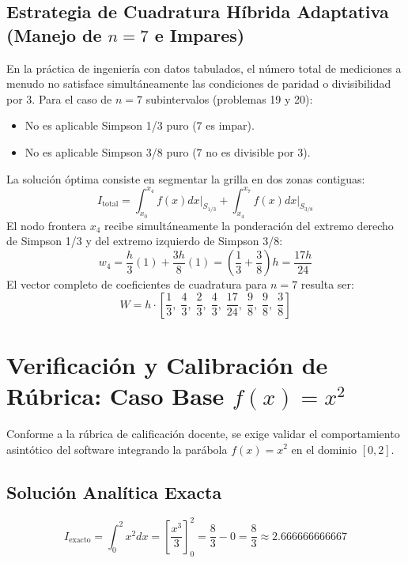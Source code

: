 \documentclass[11pt,a4paper]{article}
\begin{document}
\subsection{Estrategia de Cuadratura Híbrida Adaptativa (Manejo de $n=7$ e Impares)}
En la práctica de ingeniería con datos tabulados, el número total de mediciones a menudo no satisface simultáneamente las condiciones de paridad o divisibilidad por 3. Para el caso de $n = 7$ subintervalos (problemas 19 y 20):
\begin{itemize}
    \item No es aplicable Simpson 1/3 puro ($7$ es impar).
    \item No es aplicable Simpson 3/8 puro ($7$ no es divisible por 3).
\end{itemize}
La solución óptima consiste en segmentar la grilla en dos zonas contiguas:
\begin{equation}
I_{\text{total}} = \int_{x_0}^{x_4} f(x) dx \Bigg|_{S_{1/3}} + \int_{x_4}^{x_7} f(x) dx \Bigg|_{S_{3/8}}
\end{equation}
El nodo frontera $x_4$ recibe simultáneamente la ponderación del extremo derecho de Simpson 1/3 y del extremo izquierdo de Simpson 3/8:
\begin{equation}
w_4 = \frac{h}{3}(1) + \frac{3h}{8}(1) = \left( \frac{1}{3} + \frac{3}{8} \right) h = \frac{17h}{24}
\end{equation}
El vector completo de coeficientes de cuadratura para $n=7$ resulta ser:
\begin{equation}
W = h \cdot \left[ \frac{1}{3}, \; \frac{4}{3}, \; \frac{2}{3}, \; \frac{4}{3}, \; \frac{17}{24}, \; \frac{9}{8}, \; \frac{9}{8}, \; \frac{3}{8} \right]
\end{equation}

\section{Verificación y Calibración de Rúbrica: Caso Base $f(x)=x^2$}

Conforme a la rúbrica de calificación docente, se exige validar el comportamiento asintótico del software integrando la parábola $f(x) = x^2$ en el dominio $[0, 2]$.

\subsection{Solución Analítica Exacta}
\begin{equation}
I_{\text{exacto}} = \int_0^2 x^2 dx = \left[ \frac{x^3}{3} \right]_0^2 = \frac{8}{3} - 0 = \frac{8}{3} \approx 2.666666666667
\end{equation}
\end{document}
